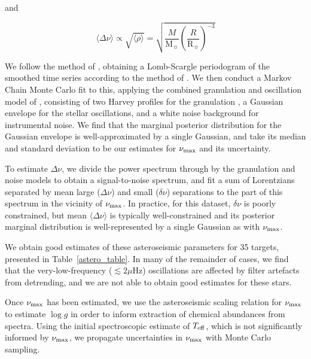 \documentclass[a4paper,fleqn,usenatbib]{mnras}
\newcommand{\numax}{\mbox{$\nu_{\rm max}$}\xspace}
\newcommand{\Dnu}{\mbox{$\Delta \nu$}\xspace}
\newcommand{\dnu}{\mbox{$\delta \nu$}\xspace}
\newcommand{\muHz}{\mbox{$\mu$Hz}\xspace}
\newcommand{\teff}{\mbox{$T_{\rm eff}$}\xspace}
\newcommand{\logg}{\mbox{$\log g$}\xspace}
\newcommand{\msun}{\mbox{$\mathrm{M}_{\sun}$}\xspace}
\newcommand{\rsun}{\mbox{$\mathrm{R}_{\sun}$}\xspace}
\begin{document}
and

\begin{equation}
\langle \Dnu \rangle \propto \sqrt{\langle \rho \rangle} = \sqrt{\dfrac{M}{\msun} (\dfrac{R}{\rsun})^{-3}}
\end{equation}

We follow the method of \citet{2016AN....337..774D}, obtaining a Lomb-Scargle periodogram of the smoothed time series according to the method of \citet{2011MNRAS.414L...6G}. We then conduct a Markov Chain Monte Carlo fit to this, applying the combined granulation and oscillation model of \citet{2014A&A...570A..41K}, consisting of two Harvey profiles for the granulation \citep{1985ESASP.235..199H}, a Gaussian envelope for the stellar oscillations, and a white noise background for instrumental noise. We find that the marginal posterior distribution for the Gaussian envelope is well-approximated by a single Gaussian, and take its median and standard deviation to be our estimates for \numax and its uncertainty.

To estimate \Dnu, we divide the power spectrum through by the granulation and noise models to obtain a signal-to-noise spectrum, and fit a sum of Lorentzians separated by mean large (\Dnu) and small (\dnu) separations to the part of this spectrum in the vicinity of \numax. In practice, for this dataset, \dnu is poorly constrained, but mean $\langle \Dnu \rangle$ is typically well-constrained and its posterior marginal distribution is well-represented by a single Gaussian as with \numax. 

We obtain good estimates of these asteroseismic parameters for 35 targets, presented in Table~\ref{astero_table}. In many of the remainder of cases, we find that the very-low-frequency ($\lesssim 2\muHz$) oscillations are affected by filter artefacts from detrending, and we are not able to obtain good estimates for these stars. 

Once \numax has been estimated, we use the asteroseismic scaling relation for \numax \citep[Equation~\ref{scaling};][]{KB95} to estimate \logg in order to inform extraction of chemical abundances from spectra. Using the initial spectroscopic estimate of \teff, which is not significantly informed by \numax, we propagate uncertainties in \numax with Monte Carlo sampling. 
\end{document}
